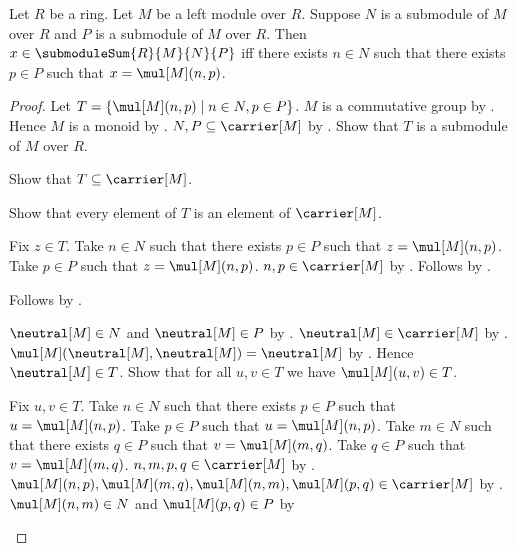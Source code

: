 \begin{theorem}\label{submodule_sum_iff}
    Let $R$ be a ring.
    Let $M$ be a left module over $R$.
    Suppose $N$ is a submodule of $M$ over $R$ and
        $P$ is a submodule of $M$ over $R$.
    Then $x\in\submoduleSum{R}{M}{N}{P}$ iff
        there exists $n\in N$ such that there exists $p\in P$ such that
            $x=\mul[M](n,p)$.
\end{theorem}
\begin{proof}
    Let $T=\{\mul[M](n,p)\mid n\in N,p\in P\}$.
    $M$ is a commutative group by
        .
    Hence $M$ is a monoid by .
    $N,P\subseteq\carrier[M]$ by .
    Show that $T$ is a submodule of $M$ over $R$.
    \begin{subproof}
        Show that $T\subseteq\carrier[M]$.
        \begin{subproof}
            Show that every element of $T$ is an element of $\carrier[M]$.
            \begin{subproof}
                Fix $z\in T$.
                Take $n\in N$ such that there exists $p\in P$ such that
                    $z=\mul[M](n,p)$.
                Take $p\in P$ such that $z=\mul[M](n,p)$.
                $n,p\in\carrier[M]$ by .
                Follows by
                    .
            \end{subproof}
            Follows by .
        \end{subproof}
        $\neutral[M]\in N$ and $\neutral[M]\in P$ by
            .
        $\neutral[M]\in\carrier[M]$ by .
        $\mul[M](\neutral[M],\neutral[M])=\neutral[M]$ by
            .
        Hence $\neutral[M]\in T$.
        Show that for all $u,v\in T$ we have $\mul[M](u,v)\in T$.
        \begin{subproof}
            Fix $u,v\in T$.
            Take $n\in N$ such that there exists $p\in P$ such that
                $u=\mul[M](n,p)$.
            Take $p\in P$ such that $u=\mul[M](n,p)$.
            Take $m\in N$ such that there exists $q\in P$ such that
                $v=\mul[M](m,q)$.
            Take $q\in P$ such that $v=\mul[M](m,q)$.
            $n,m,p,q\in\carrier[M]$ by .
            $\mul[M](n,p),\mul[M](m,q),
                \mul[M](n,m),\mul[M](p,q)\in\carrier[M]$ by
                .
            $\mul[M](n,m)\in N$ and $\mul[M](p,q)\in P$ by

\end{subproof}
\end{subproof}
\end{proof}

